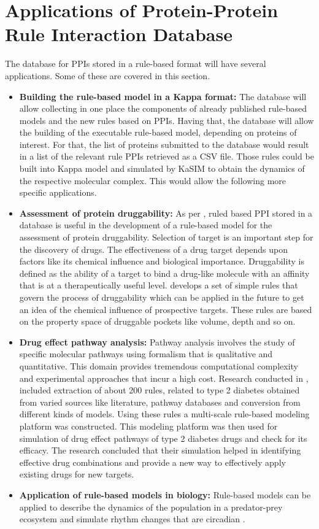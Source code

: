 \documentclass[msc,deptreport,ai]{infthesis}      %
\begin{document}
\section{Applications of Protein-Protein Rule Interaction Database}
The database for PPIs stored in a rule-based format will have several applications. Some of these are covered in this section.
\begin{itemize}
	\item
	\textbf{Building the rule-based model in a Kappa format:} The database will allow collecting in one place the components of already published rule-based models and the new rules based on PPIs. Having that, the database will allow the building of the executable rule-based model, depending on proteins of interest. For that, the list of proteins submitted to the database would result in a list of the relevant rule PPIs retrieved as a CSV file. Those rules could be built into Kappa model and simulated by KaSIM to obtain the dynamics of the respective molecular complex. This would allow the following more specific applications.
	\item
	\textbf{Assessment of protein druggability:} As per \cite{druggability}, ruled based PPI stored in a database is useful in the development of a rule-based model for the assessment of protein druggability. Selection of target is an important step for the discovery of drugs. The effectiveness of a drug target depends upon factors like  its chemical influence and biological importance. Druggability is defined as the ability of a target to bind a drug-like molecule with an affinity that is at a therapeutically useful level. \cite{druggability} develops a set of simple rules that govern the process of druggability which can be applied in the future to get an idea of the chemical influence of prospective targets. These rules are based on the property space of druggable pockets like volume, depth and so on.
	\item 
	\textbf{Drug effect pathway analysis:} Pathway analysis involves the study of specific molecular pathways using formalism that is qualitative and quantitative. This domain provides tremendous computational complexity and experimental approaches that incur a high cost. Research conducted in \cite{ruleMultiscale}, included extraction of about 200 rules, related to type 2 diabetes obtained from varied sources like literature, pathway databases and conversion from different kinds of models. Using these rules \cite{ruleMultiscale} a multi-scale rule-based modeling platform was constructed. This modeling platform was then used for simulation of drug effect pathways of type 2 diabetes drugs and check for its efficacy. The research concluded that their simulation helped in identifying effective drug combinations and provide a new way to effectively apply existing drugs for new targets.
	\item
	\textbf{Application of rule-based models in biology:} Rule-based models can be applied to describe the dynamics of the population in a predator-prey ecosystem and simulate rhythm changes that are circadian \cite{rule_based}.
\end{itemize}
\end{document}
